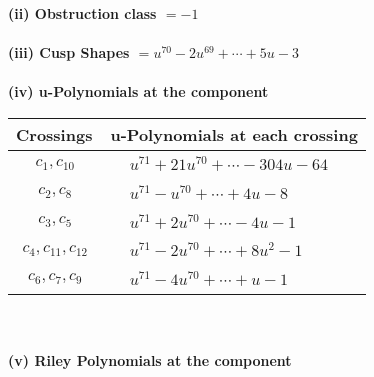 \documentclass[1p]{elsarticle_modified}
\theoremstyle{definition}
\begin{document}
\flushleft \textbf{(ii) Obstruction class $= -1$}\\~\\
\flushleft \textbf{(iii) Cusp Shapes $= u^{70}-2 u^{69}+\cdots+5 u-3$}\\~\\
\newpage\renewcommand{\arraystretch}{1}
\flushleft \textbf{(iv) u-Polynomials at the component}\newline \\
\begin{tabular}{m{50pt}|m{274pt}}
Crossings & \hspace{64pt}u-Polynomials at each crossing \\
\hline $$\begin{aligned}c_{1},c_{10}\end{aligned}$$&$\begin{aligned}
&u^{71}+21 u^{70}+\cdots-304 u-64
\end{aligned}$\\
\hline $$\begin{aligned}c_{2},c_{8}\end{aligned}$$&$\begin{aligned}
&u^{71}- u^{70}+\cdots+4 u-8
\end{aligned}$\\
\hline $$\begin{aligned}c_{3},c_{5}\end{aligned}$$&$\begin{aligned}
&u^{71}+2 u^{70}+\cdots-4 u-1
\end{aligned}$\\
\hline $$\begin{aligned}c_{4},c_{11},c_{12}\end{aligned}$$&$\begin{aligned}
&u^{71}-2 u^{70}+\cdots+8 u^2-1
\end{aligned}$\\
\hline $$\begin{aligned}c_{6},c_{7},c_{9}\end{aligned}$$&$\begin{aligned}
&u^{71}-4 u^{70}+\cdots+u-1
\end{aligned}$\\
\hline
\end{tabular}\\~\\
\newpage\renewcommand{\arraystretch}{1}
\flushleft \textbf{(v) Riley Polynomials at the component}\newline \\
\end{document}
